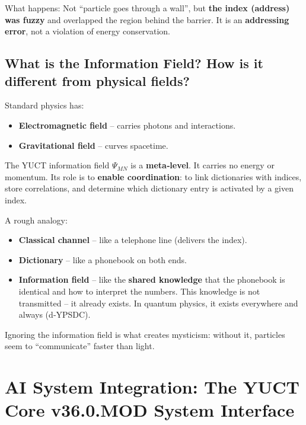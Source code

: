 \documentclass[12pt,a4paper]{article}
\begin{document}
	\noindent What happens: Not ``particle goes through a wall'', but \textbf{the index (address) was fuzzy} and overlapped the region behind the barrier. It is an \textbf{addressing error}, not a violation of energy conservation.
	
	\subsection{What is the Information Field? How is it different from physical fields?}
	
	Standard physics has:
	\begin{itemize}
		\item \textbf{Electromagnetic field} -- carries photons and interactions.
		\item \textbf{Gravitational field} -- curves spacetime.
	\end{itemize}
	The YUCT information field \(\Psi_{MN}\) is a \textbf{meta‑level}. It carries no energy or momentum. Its role is to \textbf{enable coordination}: to link dictionaries with indices, store correlations, and determine which dictionary entry is activated by a given index.
	
	A rough analogy:
	\begin{itemize}
		\item \textbf{Classical channel} -- like a telephone line (delivers the index).
		\item \textbf{Dictionary} -- like a phonebook on both ends.
		\item \textbf{Information field} -- like the \textbf{shared knowledge} that the phonebook is identical and how to interpret the numbers. This knowledge is not transmitted -- it already exists. In quantum physics, it exists everywhere and always (d‑YPSDC).
	\end{itemize}
	
	\noindent Ignoring the information field is what creates mysticism: without it, particles seem to ``communicate'' faster than light.
	
	\section{AI System Integration: The YUCT Core v36.0.MOD System Interface}
	\label{sec:ai_integration}
	
\end{document}
